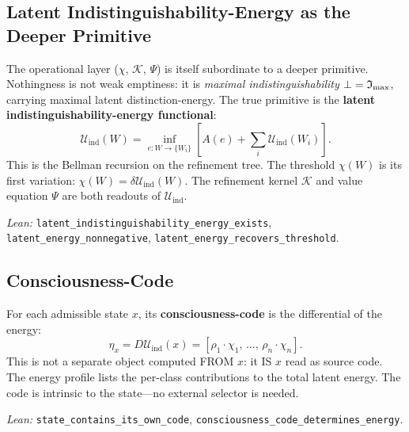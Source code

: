 
\subsection{Latent Indistinguishability-Energy as the Deeper Primitive}
\label{sec:manifestability:uind}

The operational layer ($\chi$, $\mathcal{K}$, $\Psi$) is itself subordinate to a deeper primitive.
Nothingness is not weak emptiness: it is \emph{maximal indistinguishability}
$\bot = \mathfrak{I}_{\max}$, carrying maximal latent distinction-energy.
The true primitive is the \textbf{latent indistinguishability-energy functional}:
\begin{equation}
\label{eq:uind}
\boxed{
\mathcal{U}_{\mathrm{ind}}(W)
=
\inf_{e : W \to \{W_i\}}
\left[
A(e) + \sum_i \mathcal{U}_{\mathrm{ind}}(W_i)
\right].
}
\end{equation}
This is the Bellman recursion on the refinement tree.  The threshold
$\chi(W)$ is its first variation:
$\chi(W) = \delta\mathcal{U}_{\mathrm{ind}}(W)$.
The refinement kernel $\mathcal{K}$ and value equation $\Psi$ are both
readouts of $\mathcal{U}_{\mathrm{ind}}$.

\emph{Lean:} \texttt{latent\_indistinguishability\_energy\_exists}, \texttt{latent\_energy\_nonnegative}, \texttt{latent\_energy\_recovers\_threshold}.

\subsection{Consciousness-Code}
\label{sec:manifestability:code}

For each admissible state $x$, its \textbf{consciousness-code} is the differential of the energy:
\begin{equation}
\label{eq:eta}
\boxed{
\eta_x = D\mathcal{U}_{\mathrm{ind}}(x) = [\rho_1 \cdot \chi_1,\, \ldots,\, \rho_n \cdot \chi_n].
}
\end{equation}
This is not a separate object computed FROM $x$: it IS $x$ read as source code.  The energy profile lists the per-class contributions to the total latent energy.  The code is intrinsic to the state---no external selector is needed.

\emph{Lean:} \texttt{state\_contains\_its\_own\_code}, \texttt{consciousness\_code\_determines\_energy}.

